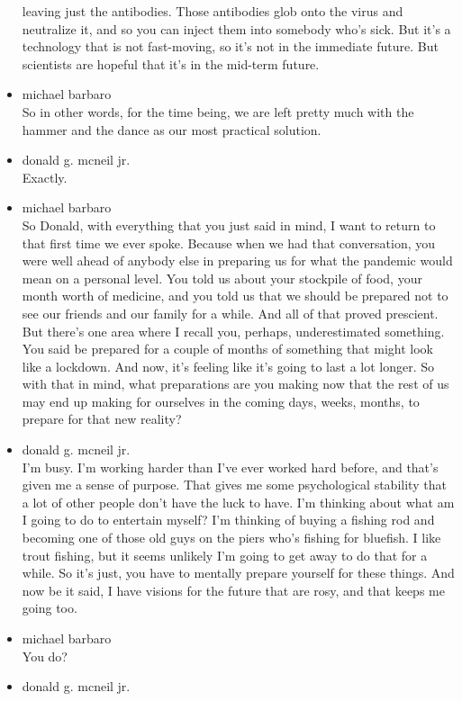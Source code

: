 \begin{itemize}
  leaving just the antibodies. Those antibodies glob onto the virus and
  neutralize it, and so you can inject them into somebody who's sick.
  But it's a technology that is not fast-moving, so it's not in the
  immediate future. But scientists are hopeful that it's in the mid-term
  future.
\item
  michael barbaro\\
  So in other words, for the time being, we are left pretty much with
  the hammer and the dance as our most practical solution.
\item
  donald g. mcneil jr.\\
  Exactly.
\item
  michael barbaro\\
  So Donald, with everything that you just said in mind, I want to
  return to that first time we ever spoke. Because when we had that
  conversation, you were well ahead of anybody else in preparing us for
  what the pandemic would mean on a personal level. You told us about
  your stockpile of food, your month worth of medicine, and you told us
  that we should be prepared not to see our friends and our family for a
  while. And all of that proved prescient. But there's one area where I
  recall you, perhaps, underestimated something. You said be prepared
  for a couple of months of something that might look like a lockdown.
  And now, it's feeling like it's going to last a lot longer. So with
  that in mind, what preparations are you making now that the rest of us
  may end up making for ourselves in the coming days, weeks, months, to
  prepare for that new reality?
\item
  donald g. mcneil jr.\\
  I'm busy. I'm working harder than I've ever worked hard before, and
  that's given me a sense of purpose. That gives me some psychological
  stability that a lot of other people don't have the luck to have. I'm
  thinking about what am I going to do to entertain myself? I'm thinking
  of buying a fishing rod and becoming one of those old guys on the
  piers who's fishing for bluefish. I like trout fishing, but it seems
  unlikely I'm going to get away to do that for a while. So it's just,
  you have to mentally prepare yourself for these things. And now be it
  said, I have visions for the future that are rosy, and that keeps me
  going too.
\item
  michael barbaro\\
  You do?
\item
  donald g. mcneil jr.\\

\end{itemize}
